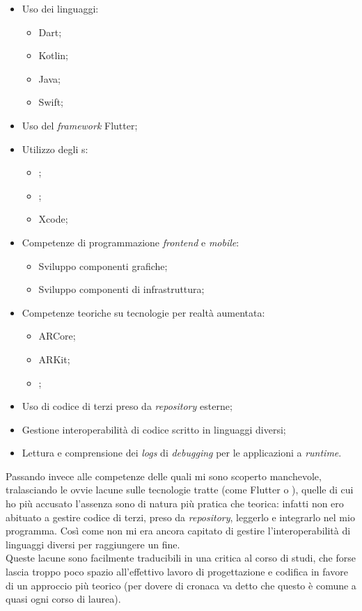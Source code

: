 \begin{itemize}
  \item Uso dei linguaggi:
      \begin{itemize}
        \item Dart;
        \item Kotlin;
        \item Java;
        \item Swift;
      \end{itemize}
  \item Uso del \textit{framework} Flutter;
  \item Utilizzo degli \ide{}s:
      \begin{itemize}
        \item \vsc{};
        \item \astudio{};
        \item Xcode;
      \end{itemize}
  \item Competenze di programmazione \textit{frontend} e \textit{mobile}:
      \begin{itemize}
        \item Sviluppo componenti grafiche;
        \item Sviluppo componenti di infrastruttura;
      \end{itemize}
  \item Competenze teoriche su tecnologie per realtà aumentata:
      \begin{itemize}
        \item ARCore;
        \item ARKit;
        \item \asa;
      \end{itemize}
  \item Uso di codice di terzi preso da \textit{repository} esterne;
  \item Gestione interoperabilità di codice scritto in linguaggi diversi;
  \item Lettura e comprensione dei \textit{logs} di \textit{debugging} per le applicazioni a \textit{runtime}.
\end{itemize}

Passando invece alle competenze delle quali mi sono scoperto manchevole, tralasciando le ovvie lacune sulle tecnologie tratte (come Flutter o \asa{}), quelle di cui ho più accusato l'assenza sono di natura più pratica che teorica: infatti non ero abituato a gestire codice di terzi, preso da \textit{repository}, leggerlo e integrarlo nel mio programma. Così come non mi era ancora capitato di gestire l'interoperabilità di linguaggi diversi per raggiungere un fine.\\
Queste lacune sono facilmente traducibili in una critica al corso di studi, che forse lascia troppo poco spazio all'effettivo lavoro di progettazione e codifica in favore di un approccio più teorico (per dovere di cronaca va detto che questo è comune a quasi ogni corso di laurea).

